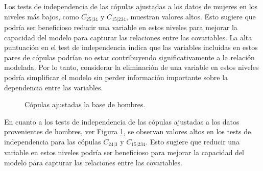 Los tests de independencia de las cópulas ajustadas a los datos de mujeres en los niveles más bajos, como $C_{25|34}$ y $C_{15|234}$, muestran valores altos. Esto sugiere que podría ser beneficioso reducir una variable en estos niveles para mejorar la capacidad del modelo para capturar las relaciones entre las covariables. La alta puntuación en el test de independencia indica que las variables incluidas en estos pares de cópulas podrían no estar contribuyendo significativamente a la relación modelada. Por lo tanto, considerar la eliminación de una variable en estos niveles podría simplificar el modelo sin perder información importante sobre la dependencia entre las variables.

\begin{figure}[H]
 \centering
    \caption{Cópulas ajustadas la base de hombres.}
    \label{fig:copulasTestHo}
\end{figure}

En cuanto a los tests de independencia de las cópulas ajustadas a los datos provenientes de hombres, ver Figura \ref{fig:copulasTestHo}, se observan valores altos en los tests de independencia para las cópulas $C_{24|3}$ y $C_{15|234}$. Esto sugiere que reducir una variable en estos niveles podría ser beneficioso para mejorar la capacidad del modelo para capturar las relaciones entre las covariables. 

